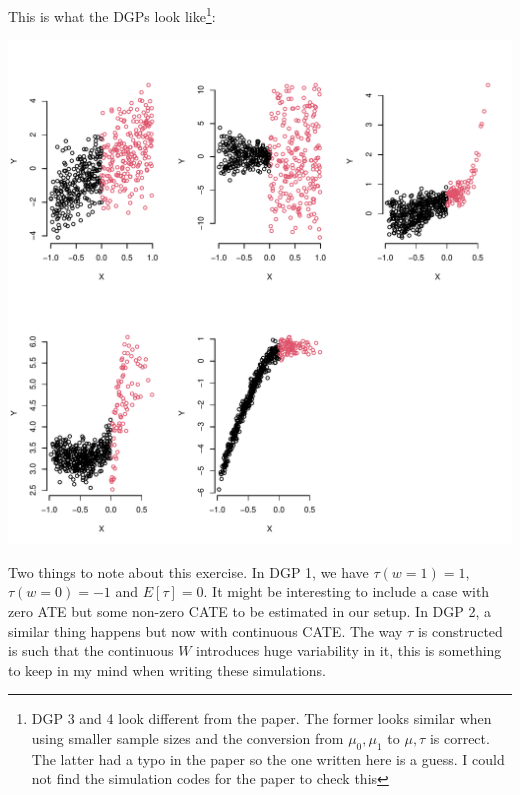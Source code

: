 \documentclass[11pt]{article}
\begin{document}
This is what the DGPs look like\footnote{DGP 3 and 4 look different from the paper. The former
looks similar when using smaller sample sizes and the
conversion from \(\mu_0,\mu_1\) to \(\mu,\tau\) is correct. The
latter had a typo in the paper so the one written here is a
guess. I could not find the simulation codes for the paper
to check this}:

\begin{center}
\includegraphics[width=.9\linewidth]{reguly.pdf}
\end{center}

Two things to note about this exercise. In DGP 1, we have
\(\tau(w=1) = 1\), \(\tau(w=0)=-1\) and \(E[\tau]=0\). It might be
interesting to include a case with zero ATE but some
non-zero CATE to be estimated in our setup. In DGP 2, a
similar thing happens but now with continuous CATE. The way
\(\tau\) is constructed is such that the continuous \(W\)
introduces huge variability in it, this is something to keep
in my mind when writing these simulations.

\clearpage


\end{document}
